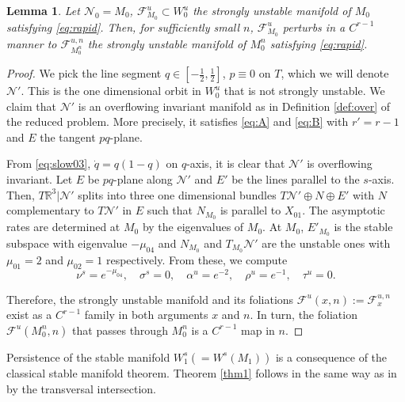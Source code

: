 \documentclass[usletter,11pt]{article}
\newtheorem{lemma}{Lemma}[section]
\theoremstyle{remark}
\begin{document}
\begin{lemma} \label{lem:rapid}
 Let $\mathcal{N}_0=M_0$, $\mathcal{F}^u_{M_0}\subset W_0^u$  the strongly unstable manifold of $M_0$ satisfying \eqref{eq:rapid}. Then, for sufficiently small $n$, $\mathcal{F}^u_{M_0}$ perturbs in a $C^{r-1}$ manner to $\mathcal{F}^{u,n}_{M_0^n}$ the strongly unstable manifold of $M_0^n$ satisfying \eqref{eq:rapid}. 
\end{lemma}
\begin{proof}
We pick the line segment $q\in [- \frac{1}{2}, \frac{1}{2}]$, $p\equiv0$ on $T$, which we will denote ${\mathcal{N}}'$. This is the one dimensional orbit in $W_0^u$ that is not strongly unstable. We claim that ${\mathcal{N}}'$ is an overflowing invariant manifold as in Definition \ref{def:over} of the reduced problem. More precisely, it satisfies \eqref{eq:A} and \eqref{eq:B} with $r'=r-1$ and $E$ the tangent $pq$-plane. 

 From \eqref{eq:slow03}, $\dot{q}=q(1-q)$ on $q$-axis, it is clear that ${\mathcal{N}}'$ is overflowing invariant. Let $E$ be $pq$-plane along ${\mathcal{N}}'$ and $E'$ be the lines parallel to the $s$-axis. Then, $T \mathbb{R}^3|{\mathcal{N}}'$ splits into three one dimensional bundles $T{\mathcal{N}}'\oplus N \oplus E'$ with $N$ complementary to $T{\mathcal{N}}'$ in $E$ such that $N_{M_0}$ is parallel to $X_{01}$.  %
 The asymptotic rates are determined at $M_0$ by the eigenvalues of $M_0$. At $M_0$, $E'_{M_0}$ is the stable subspace with eigenvalue $-\mu_{04}$ and $N_{M_0}$ and $T_{M_0}{\mathcal{N}}'$ are the unstable ones with $\mu_{01}=2$ and $\mu_{02}=1$ respectively. From these, we compute 
 $$ \nu^s = e^{-\mu_{04}}, \quad\sigma^s = 0, \quad\alpha^u = e^{-2}, \quad\rho^u=e^{-1}, \quad\tau^u=0.$$

 Therefore, the strongly unstable manifold and its foliations $\mathcal{F}^{u}(x,n):=\mathcal{F}^{u,n}_x$ exist as a $C^{r-1}$ family in both arguments $x$ and $n$. In turn, the foliation 
 $\mathcal{F}^u(M_0^n,n)$ that passes through $M_0^n$ is a $C^{r-1}$ map in $n$. 
\end{proof}

Persistence of the stable manifold $W_1^s (= W^s(M_1))$ is a consequence of the classical stable manifold theorem. Theorem \ref{thm1} follows in the same way as in \cite[Theorem 3.1]{Sz1991} by the transversal intersection.
\end{document}

